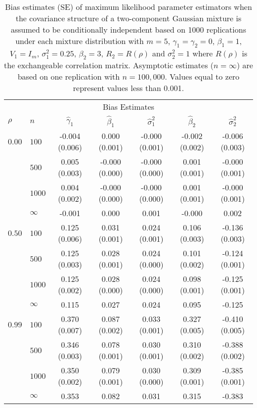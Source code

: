 \begin{table}[ht]
\begin{center}
\begin{tabular}{llccccc}
   \hline \multicolumn{7}{c}{Bias Estimates}\\ $\rho$ & $n$ & $\widehat{\gamma}_1$ & $\widehat{\beta}_1$ & $\widehat{\sigma}^2_1$ & $\widehat{\beta}_2$ & $\widehat{\sigma}^2_2$ \\ 
   \hline$0.00$ & $100$ & -0.004 (0.006) & 0.000 (0.001) & -0.000 (0.001) & -0.002 (0.002) & -0.006 (0.003) \\ 
    & $500$ & 0.005 (0.003) & -0.000 (0.000) & -0.000 (0.000) & 0.001 (0.001) & -0.000 (0.001) \\ 
    & $1000$ & 0.004 (0.002) & -0.000 (0.000) & -0.000 (0.000) & 0.001 (0.001) & -0.000 (0.001) \\ 
    & $\infty$ & -0.001 & 0.000 & 0.001 & -0.000 & 0.002 \\ 
  $0.50$ & $100$ & 0.125 (0.006) & 0.031 (0.001) & 0.024 (0.001) & 0.106 (0.003) & -0.136 (0.003) \\ 
    & $500$ & 0.125 (0.003) & 0.028 (0.001) & 0.024 (0.000) & 0.101 (0.002) & -0.124 (0.001) \\ 
    & $1000$ & 0.125 (0.002) & 0.028 (0.000) & 0.024 (0.000) & 0.098 (0.001) & -0.125 (0.001) \\ 
    & $\infty$ & 0.115 & 0.027 & 0.024 & 0.095 & -0.125 \\ 
  $0.99$ & $100$ & 0.370 (0.007) & 0.087 (0.002) & 0.033 (0.001) & 0.327 (0.005) & -0.410 (0.005) \\ 
    & $500$ & 0.346 (0.003) & 0.078 (0.001) & 0.030 (0.001) & 0.310 (0.002) & -0.388 (0.002) \\ 
    & $1000$ & 0.350 (0.002) & 0.079 (0.001) & 0.030 (0.000) & 0.309 (0.001) & -0.385 (0.001) \\ 
    & $\infty$ & 0.353 & 0.082 & 0.031 & 0.315 & -0.383 \\ 
   \hline\end{tabular}
\caption{Bias estimates (SE) of maximum likelihood parameter estimators when the covariance structure of a two-component Gaussian mixture is assumed to be conditionally independent based on 1000 replications under each mixture distribution with $m=5$, $\gamma_1=\gamma_2=0$, $\beta_{1}=1$, $V_1=I_{m}$, $\sigma_1^{2}=0.25$, $\beta_2=3$, $R_2=R(\rho)$ and $\sigma_2^{2}=1$ where $R(\rho)$ is the exchangeable correlation matrix. Asymptotic estimates ($n=\infty$) are based on one replication with $n=100,000$. Values equal to zero represent values less than 0.001.}
\label{tab:dep1}
\end{center}
\end{table}

